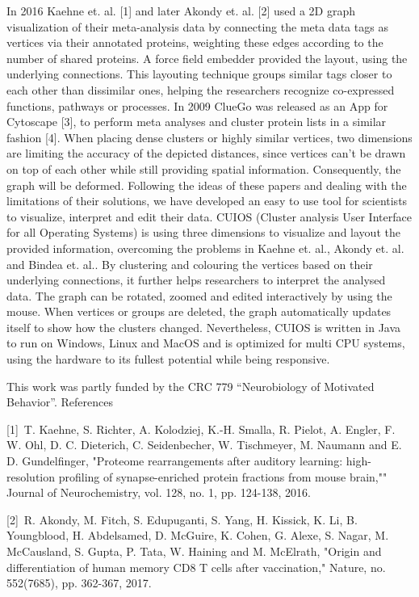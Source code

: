 {In 2016 Kaehne et. al. [1] and later Akondy et. al. [2] used a 2D graph visualization of their meta-analysis data by connecting the meta data tags as vertices via their annotated proteins, weighting these edges according to the number of shared proteins. A force field embedder provided the layout, using the underlying connections. This layouting technique groups similar tags closer to each other than dissimilar ones, helping the researchers recognize co-expressed functions, pathways or processes. In 2009 ClueGo was released as an App for Cytoscape [3], to perform meta analyses and cluster protein lists in a similar fashion [4]. When placing dense clusters or highly similar vertices, two dimensions are limiting the accuracy of the depicted distances, since vertices can’t be drawn on top of each other while still providing spatial information. Consequently, the graph will be deformed. Following the ideas of these papers and dealing with the limitations of their solutions, we have developed an easy to use tool for scientists to visualize, interpret and edit their data. CUIOS (Cluster analysis User Interface for all Operating Systems) is using three dimensions to visualize and layout the provided information, overcoming the problems in Kaehne et. al., Akondy et. al. and Bindea et. al.. By clustering and colouring the vertices based on their underlying connections, it further helps researchers to interpret the analysed data. The graph can be rotated, zoomed and edited interactively by using the mouse. When vertices or groups are deleted, the graph automatically updates itself to show how the clusters changed. Nevertheless, CUIOS is written in Java to run on Windows, Linux and MacOS and is optimized for multi CPU systems, using the hardware to its fullest potential while being responsive.

This work was partly funded by the CRC 779 “Neurobiology of Motivated Behavior”.
References

[1] T. Kaehne, S. Richter, A. Kolodziej, K.-H. Smalla, R. Pielot, A. Engler, F. W. Ohl, D. C. Dieterich, C. Seidenbecher, W. Tischmeyer, M. Naumann and E. D. Gundelfinger, "Proteome rearrangements after auditory learning: high-resolution profiling of synapse-enriched protein fractions from mouse brain,"" Journal of Neurochemistry, vol. 128, no. 1, pp. 124-138, 2016.

[2] R. Akondy, M. Fitch, S. Edupuganti, S. Yang, H. Kissick, K. Li, B. Youngblood, H. Abdelsamed, D. McGuire, K. Cohen, G. Alexe, S. Nagar, M. McCausland, S. Gupta, P. Tata, W. Haining and M. McElrath, "Origin and differentiation of human memory CD8 T cells after vaccination," Nature, no. 552(7685), pp. 362-367, 2017.

}
